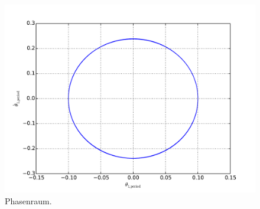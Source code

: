 \begin{figure}[h!]
	\includegraphics[width = \textwidth]{../Plots/Plot_2_A_3_Phasenraum.pdf}
	\caption{Phasenraum.\label{fig:phasenraum3}}
\end{figure}